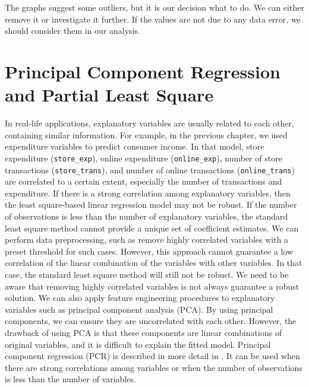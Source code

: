 \documentclass[12pt,]{krantz}
\begin{document}
The graphs suggest some outliers, but it is our decision what to do. We can either remove it or investigate it further. If the values are not due to any data error, we should consider them in our analysis.

\hypertarget{principal-component-regression-and-partial-least-square}{%
\section{Principal Component Regression and Partial Least Square}\label{principal-component-regression-and-partial-least-square}}

In real-life applications, explanatory variables are usually related to each other, containing similar information. For example, in the previous chapter, we used expenditure variables to predict consumer income. In that model, store expenditure (\texttt{store\_exp}), online expenditure (\texttt{online\_exp}), number of store transactions (\texttt{store\_trans}), and number of online transactions (\texttt{online\_trans}) are correlated to a certain extent, especially the number of transactions and expenditure. If there is a strong correlation among explanatory variables, then the least square-based linear regression model may not be robust. If the number of observations is less than the number of explanatory variables, the standard least square method cannot provide a unique set of coefficient estimates. We can perform data preprocessing, such as remove highly correlated variables with a preset threshold for such cases. However, this approach cannot guarantee a low correlation of the linear combination of the variables with other variables. In that case, the standard least square method will still not be robust. We need to be aware that removing highly correlated variables is not always guarantee a robust solution. We can also apply feature engineering procedures to explanatory variables such as principal component analysis (PCA).  By using principal components, we can ensure they are uncorrelated with each other. However, the drawback of using PCA is that these components are linear combinations of original variables, and it is difficult to explain the fitted model. Principal component regression (PCR)  is described in more detail in \citep{Massy1965}. It can be used when there are strong correlations among variables or when the number of observations is less than the number of variables.
\end{document}
